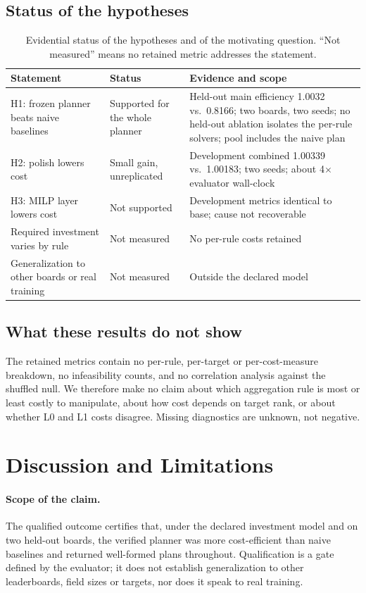 \documentclass{article}
\begin{document}
\subsection{Status of the hypotheses}
\begin{table}[t]
\centering
\caption{Evidential status of the hypotheses and of the motivating question. ``Not measured'' means no retained metric addresses the statement.}
\label{tab:status}
\small
\begin{tabular}{@{}p{3.3cm}p{1.9cm}p{4.0cm}@{}}
\toprule
Statement & Status & Evidence and scope\\
\midrule
H1: frozen planner beats naive baselines & Supported for the whole planner & Held-out main efficiency 1.0032 vs.\ 0.8166; two boards, two seeds; no held-out ablation isolates the per-rule solvers; pool includes the naive plan\\
H2: polish lowers cost & Small gain, unreplicated & Development combined 1.00339 vs.\ 1.00183; two seeds; about 4$\times$ evaluator wall-clock\\
H3: MILP layer lowers cost & Not supported & Development metrics identical to base; cause not recoverable\\
Required investment varies by rule & Not measured & No per-rule costs retained\\
Generalization to other boards or real training & Not measured & Outside the declared model\\
\bottomrule
\end{tabular}
\end{table}

\subsection{What these results do not show}
The retained metrics contain no per-rule, per-target or per-cost-measure breakdown, no infeasibility counts, and no correlation analysis against the shuffled null. We therefore make no claim about which aggregation rule is most or least costly to manipulate, about how cost depends on target rank, or about whether L0 and L1 costs disagree. Missing diagnostics are unknown, not negative.

\section{Discussion and Limitations}\label{sec:limits}
\paragraph{Scope of the claim.} The qualified outcome certifies that, under the declared investment model and on two held-out boards, the verified planner was more cost-efficient than naive baselines and returned well-formed plans throughout. Qualification is a gate defined by the evaluator; it does not establish generalization to other leaderboards, field sizes or targets, nor does it speak to real training.
\end{document}
